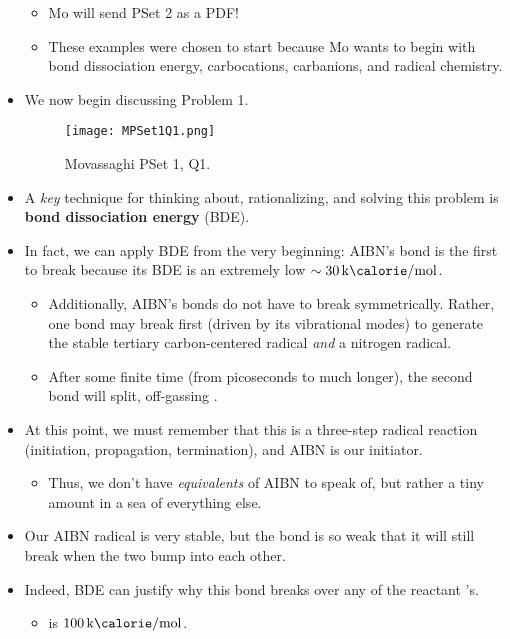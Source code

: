 \documentclass[../notes.tex]{subfiles}
\begin{document}
\begin{itemize}
\begin{itemize}
\begin{itemize}
        \end{itemize}
        \item Mo will send PSet 2 as a PDF!
        \item These examples were chosen to start because Mo wants to begin with bond dissociation energy, carbocations, carbanions, and radical chemistry.
    \end{itemize}
    \item We now begin discussing Problem 1.
    \begin{figure}[H]
        \centering
        \texttt{[image: MPSet1Q1.png]}
        \caption{Movassaghi PSet 1, Q1.}
        \label{fig:MPSet1Q1}
    \end{figure}
    \item A \emph{key} technique for thinking about, rationalizing, and solving this problem is \textbf{bond dissociation energy} (BDE).
    \item In fact, we can apply BDE from the very beginning: AIBN's  bond is the first to break because its BDE is an extremely low $\sim\SI{30}{\kilo\calorie\per\mole}$.
    \begin{itemize}
        \item Additionally, AIBN's  bonds do not have to break symmetrically. Rather, one bond may break first (driven by its vibrational modes) to generate the stable tertiary carbon-centered radical \emph{and} a nitrogen radical.
        \item After some finite time (from picoseconds to much longer), the second  bond will split, off-gassing .
    \end{itemize}
    \item At this point, we must remember that this is a three-step radical reaction (initiation, propagation, termination), and AIBN is our initiator.
    \begin{itemize}
        \item Thus, we don't have \emph{equivalents} of AIBN to speak of, but rather a tiny amount in a sea of everything else.
    \end{itemize}
    \item Our AIBN radical is very stable, but the  bond is so weak that it will still break when the two bump into each other.
    \item Indeed, BDE can justify why this bond breaks over any of the reactant 's.
    \begin{itemize}
        \item {} is $\SI{100}{\kilo\calorie\per\mole}$.

\end{itemize}
\end{itemize}
\end{document}
